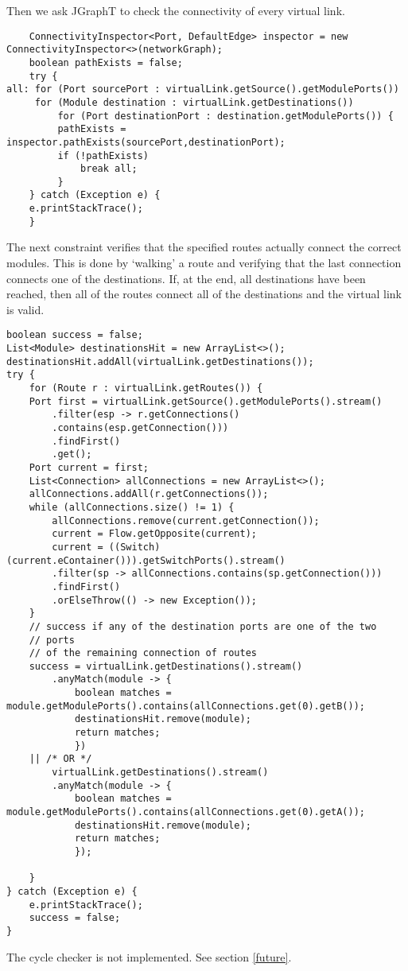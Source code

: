 Then we ask JGraphT to check the connectivity of every virtual link.
\begin{verbatim}
    ConnectivityInspector<Port, DefaultEdge> inspector = new ConnectivityInspector<>(networkGraph);
    boolean pathExists = false;
    try {
all: for (Port sourcePort : virtualLink.getSource().getModulePorts()) 
	 for (Module destination : virtualLink.getDestinations()) 
	     for (Port destinationPort : destination.getModulePorts()) {
		 pathExists = inspector.pathExists(sourcePort,destinationPort);
		 if (!pathExists)
		     break all;
	     }
    } catch (Exception e) {
	e.printStackTrace();
    }
\end{verbatim}
The next constraint verifies that the specified routes actually connect the correct modules.
This is done by `walking' a route and verifying that the last connection
connects one of the destinations. If, at the end, all destinations have been reached,
then all of the routes connect all of the destinations and the virtual link is valid.
\begin{verbatim}
boolean success = false;
List<Module> destinationsHit = new ArrayList<>();
destinationsHit.addAll(virtualLink.getDestinations());
try {
    for (Route r : virtualLink.getRoutes()) {
	Port first = virtualLink.getSource().getModulePorts().stream()
	    .filter(esp -> r.getConnections()
		.contains(esp.getConnection()))
	    .findFirst()
	    .get();
	Port current = first;
	List<Connection> allConnections = new ArrayList<>();
	allConnections.addAll(r.getConnections());
	while (allConnections.size() != 1) {
	    allConnections.remove(current.getConnection());
	    current = Flow.getOpposite(current);
	    current = ((Switch) (current.eContainer())).getSwitchPorts().stream()
		.filter(sp -> allConnections.contains(sp.getConnection()))
		.findFirst()
		.orElseThrow(() -> new Exception());
	}
	// success if any of the destination ports are one of the two
	// ports
	// of the remaining connection of routes
	success = virtualLink.getDestinations().stream()
	    .anyMatch(module -> {
		    boolean matches = module.getModulePorts().contains(allConnections.get(0).getB());
		    destinationsHit.remove(module);
		    return matches;
		    })
	|| /* OR */
	    virtualLink.getDestinations().stream()
	    .anyMatch(module -> {
		    boolean matches = module.getModulePorts().contains(allConnections.get(0).getA());
		    destinationsHit.remove(module);
		    return matches;
		    });

    }
} catch (Exception e) {
    e.printStackTrace();
    success = false;
}
\end{verbatim}
The cycle checker is not implemented. See section \ref{future}.
